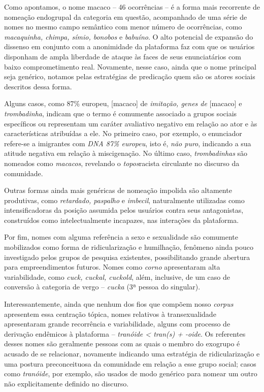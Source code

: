 \documentclass[portuguese]{textolivre}
\begin{document}
Como apontamos, o nome macaco – 46 ocorrências – é a forma mais recorrente de nomeação endogrupal da categoria em questão, acompanhado de uma série de nomes no mesmo campo semântico com menor número de ocorrências, como \emph{macaquinha, chimpa, símio, bonobos} e \emph{babuíno}. O alto potencial de expansão do dissenso em conjunto com a anonimidade da plataforma faz com que os usuários disponham de ampla liberdade de ataque às faces \cite{brown1987politeness} de seus enunciatários com baixo comprometimento real. Novamente, nesse caso, ainda que o nome principal seja genérico, notamos pelas estratégias de predicação quem são os atores sociais descritos dessa forma. 

Alguns casos, como 87\% europeu, [macaco] de \emph{imitação, genes de} [macaco] e \emph{trombadinha}, indicam que o termo é comumente associado a grupos sociais específicos ou representam um caráter avaliativo negativo em relação ao ator e às características atribuídas a ele. No primeiro caso, por exemplo, o enunciador refere-se a imigrantes com \emph{DNA 87\% europeu}, isto é, \emph{não puro}, indicando a sua atitude negativa em relação à miscigenação. No último caso, \emph{trombadinhas} são nomeados como \emph{macacos}, revelando o \emph{topos}racista circulante no discurso da comunidade.

Outras formas ainda mais genéricas de nomeação impolida são altamente produtivas, como \emph{retardado, paspalho} e \emph{imbecil}, naturalmente utilizadas como intensificadoras da posição assumida pelos usuários contra seus antagonistas, construídos como intelectualmente incapazes, nas interações da plataforma.

Por fim, nomes com alguma referência a sexo e sexualidade são comumente mobilizados como forma de ridicularização e humilhação, fenômeno ainda pouco investigado pelos grupos de pesquisa existentes, possibilitando grande abertura para empreendimentos futuros. Nomes como \emph{corno} apresentaram alta variabilidade, como \emph{cuck, cuckal, cuckold}, além, inclusive, de um caso de conversão à categoria de vergo – \emph{cucka} (3ª pessoa do singular). 

Interessantemente, ainda que nenhum dos fios que compõem nosso \emph{corpus} apresentem essa centração tópica, nomes relativos à transexualidade apresentaram grande recorrência e variabilidade, alguns com processo de derivação endêmicos à plataforma – \emph{tranóide < tran(s) + -oide}. Os referentes desses nomes são geralmente pessoas com as quais o membro do exogrupo é acusado de se relacionar, novamente indicando uma estratégia de ridicularização e uma postura preconceituosa da comunidade em relação a esse grupo social; casos como \emph{tranóide}, por exemplo, são usados de modo genérico para nomear um outro não explicitamente definido no discurso.
\end{document}
